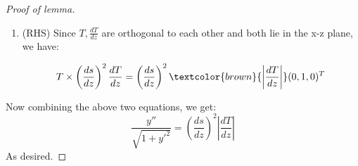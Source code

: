\begin{framed}
\begin{proof}[Proof of lemma]
\begin{enumerate}
\begin{equation}
\frac{1}{\sqrt{1+y'^2}} (1,0,y')^T \times (0,0,y'')  = \frac{1}{\sqrt{1+y'^2}}(0,y'',0)^T
\end{equation}


\item (RHS) Since $T, \frac{dT}{dz}$ are orthogonal to each other and both lie in the x-z plane, we have:

\begin{equation}
T \times \left(\frac{ds}{dz}\right)^2\frac{dT}{dz} =  \left(\frac{ds}{dz}\right)^2 \textcolor{brown}{\left|\frac{dT}{dz}\right|} (0,1,0)^T
\end{equation}
\end{enumerate}

Now combining the above two equations, we get:
\begin{equation}
\frac{y''}{\sqrt{1+y'^2}}=\left(\frac{ds}{dz}\right)^2  \left|\frac{dT}{dz}\right|
\end{equation}
As desired.

\end{proof}
\end{framed}


